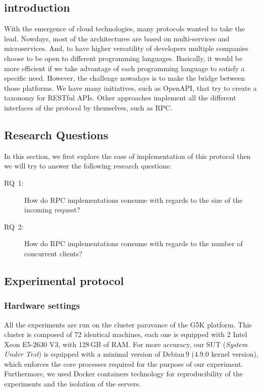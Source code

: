 

\subsection*{introduction}
With the emergence of cloud technologies, many protocols wanted to take the lead.
Nowdays, most of the architectures are based on multi-services and microservices.
And, to have higher versatility of developers multiple companies choose to be open to different programming languages.
Basically, it would be more efficient if we take advantage of each programming language to satisfy a specific need.
However, the challenge nowadays is to make the bridge between those platforms.
We have many initiatives, such as OpenAPI, that try to create a taxonomy for RESTful APIs.
Other approaches implement all the different interfaces of the protocol by themselves, such as RPC.

\subsection{Research Questions}
In this section, we first explore the ease of implementation of this protocol then we will try to answer the following research questions:
\begin{description}
    \item[\textsc{RQ}~1:] How do RPC implementations consume with regards to the size of the incoming request?
    \item[\textsc{RQ}~2:] How do RPC implementations consume with regards to the number of concurrent clients?
\end{description}

\subsection{Experimental protocol}
\subsubsection{Hardware settings}
All the experiments are run on the cluster \textsf{paravance} of the G5K platform.
This cluster is composed of 72 identical machines, each one is equipped with 2 Intel Xeon E5-2630 V3, with 128\,GB of RAM.
For more accuracy, our SUT (\emph{System Under Test}) is equipped with a minimal version of Debian\,9 (4.9.0 kernel version), which enforces the core processes required for the purpose of our experiment.
Furthermore, we used Docker containers technology for reproducibility of the experiments and the isolation of the servers.

